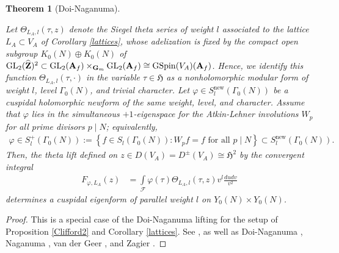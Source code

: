 \documentclass{amsart}
\newtheorem{theorem}{Theorem}[section]
\theoremstyle{definition}
\theoremstyle{definition}
\theoremstyle{definition}
\begin{document}
\begin{theorem}[Doi-Naganuma]\label{D-N}

Let $\Theta_{L_A, l}(\tau, z)$ denote the Siegel theta series of weight $l$ associated to the lattice 
$L_A \subset V_A$ of Corollary \ref{lattices}, whose adelization is fixed by the compact open subgroup $K_0(N) \oplus K_0(N)$ of 
$\operatorname{GL}_2(\widehat{\bf{Z}})^2 \subset  \operatorname{GL}_2({\bf{A}}_f) \times_{{\bf{G}}_m} \operatorname{GL}_2({\bf{A}}_f) \cong \operatorname{GSpin}(V_A)({\bf{A}}_f)$.
Hence, we identify this function $\Theta_{L_A, l}(\tau, \cdot)$ in the variable $\tau \in \mathfrak{H}$ 
as a nonholomorphic modular form of weight $l$, level $\Gamma_0(N)$, and trivial character.
Let $\varphi \in S^{\operatorname{new}}_l(\Gamma_0(N))$ be a cuspidal holomorphic newform of the same weight, level, and character. 
Assume that $\varphi$ lies in the simultaneous $+1$-eigenspace for the Atkin-Lehner involutions $W_p$ for all prime divisors $p \mid N$; equivalently, 
\begin{align*}\varphi \in S_{l}^+(\Gamma_0(N))  := \left\lbrace f \in S_l(\Gamma_0(N)) :  W_p f = f \text{ for all $p \mid N$} \right\rbrace 
\subset S^{\operatorname{new}}_{l}(\Gamma_0( N)). \end{align*}
Then, the theta lift defined on $z \in D(V_A) = D^{\pm}(V_A) \cong \mathfrak{H}^2$ by the convergent integral
\begin{align*} F_{\varphi, L_A}(z) &= \int\limits_{\mathcal{F}} \varphi(\tau) \Theta_{L_A, l}(\tau, z) v^l  \frac{du dv}{v^2}\end{align*}
determines a cuspidal eigenform of parallel weight $l$ on $Y_0(N) \times Y_0(N)$.
\end{theorem}

\begin{proof} This is a special case of the Doi-Naganuma lifting for the setup of Proposition \ref{Clifford2} and Corollary \ref{lattices}. 
See \cite[$\S$3.1]{Br-123}, as well as Doi-Naganuma \cite{DN}, Naganuma \cite{Na}, van der Geer \cite[$\S$4]{vdG}, and Zagier \cite{Za}. \end{proof}
\end{document}

